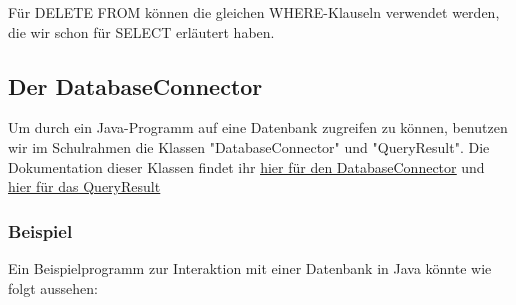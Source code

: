 \documentclass{article}
\begin{document}
	Für DELETE FROM können die gleichen WHERE-Klauseln verwendet werden, die wir schon für SELECT erläutert haben.

	\subsection{Der DatabaseConnector}
Um durch ein Java-Programm auf eine Datenbank zugreifen zu können, benutzen wir im Schulrahmen die Klassen "DatabaseConnector" und "QueryResult". Die Dokumentation dieser Klassen findet ihr \href{https://www.schulentwicklung.nrw.de/lehrplaene/upload/klp\_SII/if/Dokumentation\_ZA-IF\_GK-LK\_ab\_2018\_2021\_12\_22.pdf#page=31}{\underline{hier für den DatabaseConnector}} und \href{https://www.schulentwicklung.nrw.de/lehrplaene/upload/klp\_SII/if/Dokumentation\_ZA-IF\_GK-LK\_ab\_2018\_2021\_12\_22.pdf#page=32}{\underline{hier für das QueryResult}}

	\subsubsection{Beispiel}
	Ein Beispielprogramm zur Interaktion mit einer Datenbank in Java könnte wie folgt aussehen:
\end{document}
